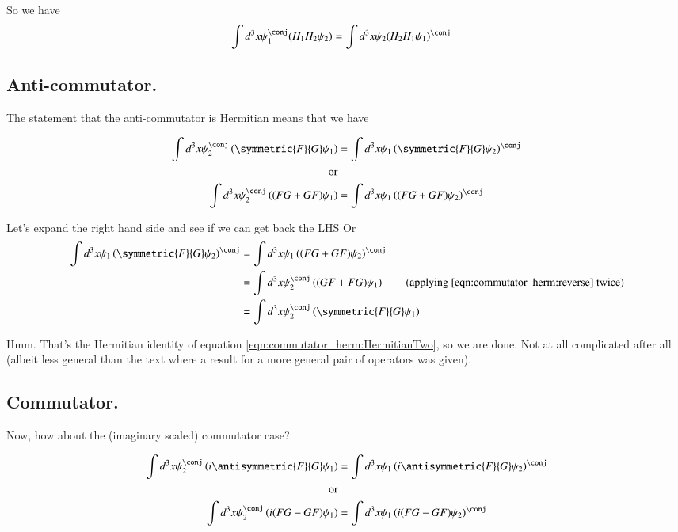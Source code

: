 So we have
\begin{align}\label{eqn:commutator_herm:reverse}
\int d^3 x \psi_1^\conj (H_1 H_2 \psi_2) &= \int d^3 x \psi_2 (H_2 H_1 \psi_1)^\conj 
\end{align}

\subsection{Anti-commutator. }

The statement that the anti-commutator is Hermitian means that we have

\begin{align*}
\int d^3 x \psi_2^\conj \left( \symmetric{F}{G} \psi_1 \right) &= \int d^3 x \psi_1 \left(\symmetric{F}{G} \psi_2 \right)^\conj \\
\text{or} \\
\int d^3 x \psi_2^\conj \left( (F G + G F) \psi_1 \right) &= \int d^3 x \psi_1 \left((F G + G F) \psi_2 \right)^\conj \\
\end{align*}

Let's expand the right hand side and see if we can get back the LHS
Or
\begin{align*}
\int d^3 x \psi_1 \left(\symmetric{F}{G} \psi_2 \right)^\conj 
&=
\int d^3 x \psi_1 \left((F G + G F) \psi_2 \right)^\conj \\
&=
\int d^3 x \psi_2^\conj \left((G F + F G) \psi_1 \right) \quad\quad \text{(applying \ref{eqn:commutator_herm:reverse} twice)} \\
&=
\int d^3 x \psi_2^\conj \left( \symmetric{F}{G} \psi_1 \right) \\
\end{align*}

Hmm.  That's the Hermitian identity of equation \ref{eqn:commutator_herm:HermitianTwo}, so we are done.  Not at all complicated after all (albeit less
general than the text where a result for a more general pair of operators was given).

\subsection{Commutator. }

Now, how about the (imaginary scaled) commutator case?

\begin{align*}
\int d^3 x \psi_2^\conj \left( i \antisymmetric{F}{G} \psi_1 \right) &= \int d^3 x \psi_1 \left( i \antisymmetric{F}{G} \psi_2 \right)^\conj \\
\text{or} \\
\int d^3 x \psi_2^\conj \left( i(F G - G F) \psi_1 \right) &= \int d^3 x \psi_1 \left(i(F G - G F) \psi_2 \right)^\conj \\
\end{align*}

